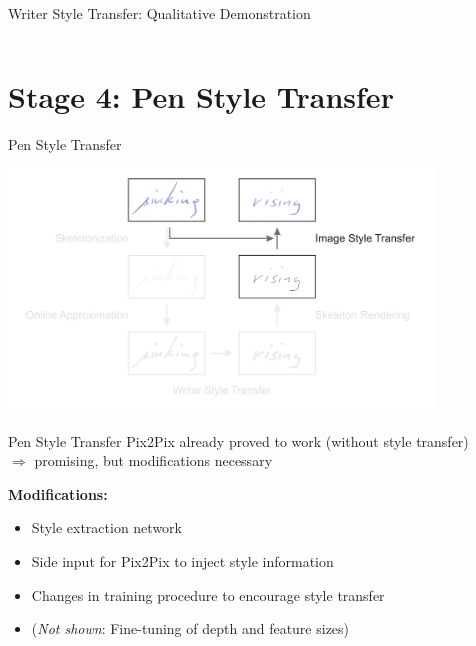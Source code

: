 \documentclass[aspectratio=169]{beamer}
\begin{document}
\begin{frame}{Writer Style Transfer: Qualitative Demonstration}
\begin{table}
{\begin{tabular}{ll}
  \bottomrule
  \end{tabular}
  }
\end{table}
\end{frame}





\section{Stage 4: Pen Style Transfer}
\begin{frame}{Pen Style Transfer}
\begin{center}
\vspace{-1em}
\includegraphics[width=0.85\textwidth]{assets/pipeline/pipeline_pentransfer.pdf}
\end{center}
\end{frame}




\begin{frame}{Pen Style Transfer}
Pix2Pix already proved to work (without style transfer)\\
$\Rightarrow$ promising, but modifications necessary

\vspace{1em}
\textbf{Modifications:}
\begin{itemize}
\item Style extraction network
\item Side input for Pix2Pix to inject style information
\item Changes in training procedure to encourage style transfer
\item (\emph{Not shown}: Fine-tuning of depth and feature sizes)
\end{itemize}
\end{frame}
\end{document}
